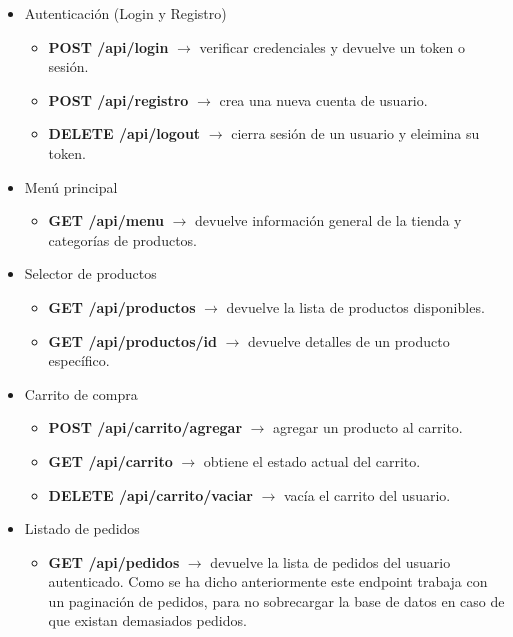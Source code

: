 \documentclass[10pt]{book}
\begin{document}
        \begin{itemize}
            \item Autenticación (Login y Registro)
            \begin{itemize}
                \item \textbf{POST /api/login} $\rightarrow$ verificar credenciales y devuelve un token o sesión.
                \item \textbf{POST /api/registro} $\rightarrow$ crea una nueva cuenta de usuario.
                \item \textbf{DELETE /api/logout} $\rightarrow$ cierra sesión de un usuario y eleimina su token.
            \end{itemize}
            \item Menú principal
            \begin{itemize}
                \item \textbf{GET /api/menu} $\rightarrow$ devuelve información general de la tienda y categorías de productos.
            \end{itemize}
            \item Selector de productos
            \begin{itemize}
                \item \textbf{GET /api/productos} $\rightarrow$ devuelve la lista de productos disponibles.
                \item \textbf{GET /api/productos/{id}} $\rightarrow$ devuelve detalles de un producto específico.
            \end{itemize}
            \item Carrito de compra
            \begin{itemize}
                \item \textbf{POST /api/carrito/agregar} $\rightarrow$ agregar un producto al carrito.
                \item \textbf{GET /api/carrito} $\rightarrow$ obtiene el estado actual del carrito.
                \item \textbf{DELETE /api/carrito/vaciar} $\rightarrow$ vacía el carrito del usuario.
            \end{itemize}
            \item Listado de pedidos
            \begin{itemize}
                \item \textbf{GET /api/pedidos} $\rightarrow$ devuelve la lista de pedidos del usuario autenticado. Como se ha dicho anteriormente este endpoint trabaja con un paginación de pedidos, para no sobrecargar la base de datos en caso de que existan demasiados pedidos.

\end{itemize}
\end{itemize}
\end{document}
